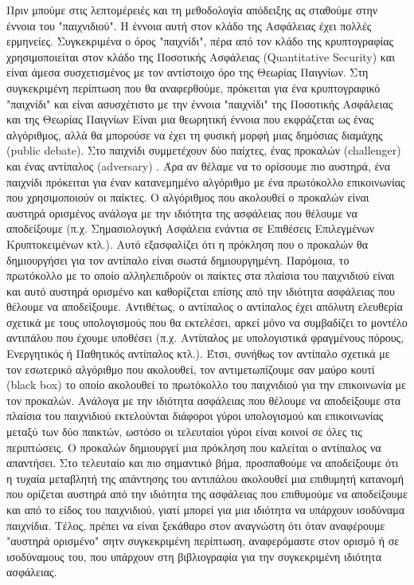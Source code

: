 Πριν μπούμε στις λεπτομέρειές και τη μεθοδολογία απόδειξης ας σταθούμε στην έννοια του "παιχνιδιού". Η έννοια αυτή στον κλάδο της Ασφάλειας έχει πολλές ερμηνείες. Συγκεκριμένα ο όρος "παιχνίδι", πέρα από τον κλάδο της κρυπτογραφίας χρησιμοποιείται στον κλάδο της Ποσοτικής Ασφάλειας (Quantitative Security) και είναι άμεσα συσχετισμένος με τον αντίστοιχο όρο της Θεωρίας Παιγνίων. Στη συγκεκριμένη περίπτωση που θα αναφερθούμε, πρόκειται για ένα κρυπτογραφικό "παιχνίδι" και είναι ασυσχέτιστο με την έννοια "παιχνίδι" της Ποσοτικής Ασφάλειας και της Θεωρίας Παιγνίων \cite{Alpcan2019} Είναι μια θεωρητική έννοια που εκφράζεται ως ένας αλγόριθμος, αλλά θα μπορούσε να έχει τη φυσική μορφή μιας δημόσιας διαμάχης (public debate). Στο παιχνίδι συμμετέχουν δύο παίχτες, ένας προκαλών (challenger) \cdv και ένας αντίπαλος (adversary) \adv. Άρα αν θέλαμε να το ορίσουμε πιο αυστηρά, ένα παιχνίδι πρόκειται για έναν κατανεμημένο αλγόριθμο με ένα πρωτόκολλο επικοινωνίας που χρησιμοποιούν οι παίκτες. Ο αλγόριθμος που ακολουθεί ο προκαλών είναι αυστηρά ορισμένος ανάλογα με την ιδιότητα της ασφάλειας που θέλουμε να αποδείξουμε (π.χ. Σημασιολογική Ασφάλεια ενάντια σε Επιθέσεις Επιλεγμένων Κρυπτοκειμένων κτλ.). Αυτό εξασφαλίζει ότι η πρόκληση που ο προκαλών θα δημιουργήσει για τον αντίπαλο είναι σωστά δημιουργημένη. Παρόμοια, το πρωτόκολλο με το οποίο αλληλεπιδρούν οι παίκτες στα πλαίσια του παιχνιδιού είναι και αυτό αυστηρά ορισμένο και καθορίζεται επίσης από την ιδιότητα ασφάλειας που θέλουμε να αποδείξουμε. Αντιθέτως, ο αντίπαλος ο αντίπαλος έχει απόλυτη ελευθερία σχετικά με τους υπολογισμούς που θα εκτελέσει, αρκεί μόνο να συμβαδίζει το μοντέλο αντιπάλου που έχουμε υποθέσει (π.χ. Αντίπαλος με υπολογιστικά φραγμένους πόρους, Ενεργητικός ή Παθητικός αντίπαλος κτλ.). Έτσι, συνήθως τον αντίπαλο σχετικά με τον εσωτερικό αλγόριθμο που ακολουθεί, τον αντιμετωπίζουμε σαν μαύρο κουτί (black box) το οποίο ακολουθεί το πρωτόκολλο του παιχνιδιού για την επικοινωνία με τον προκαλών. Ανάλογα με την ιδιότητα ασφάλειας που θέλουμε να αποδείξουμε στα πλαίσια του παιχνιδιού εκτελούνται διάφοροι γύροι υπολογισμού και επικοινωνίας μεταξύ των δύο παικτών, ωστόσο οι τελευταίοι γύροι είναι κοινοί σε όλες τις περιπτώσεις. Ο προκαλών δημιουργεί μια πρόκληση που καλείται ο αντίπαλος να απαντήσει. Στο τελευταίο και πιο σημαντικό βήμα, προσπαθούμε να αποδείξουμε ότι η τυχαία μεταβλητή της απάντησης του αντιπάλου ακολουθεί μια επιθυμητή κατανομή που ορίζεται αυστηρά από την ιδιότητα της ασφάλειας που επιθυμούμε να αποδείξουμε και από το είδος του παιχνιδιού, γιατί μπορεί για μια ιδιότητα να υπάρχουν ισοδύναμα παιχνίδια. Τέλος, πρέπει να είναι ξεκάθαρο στον αναγνώστη ότι όταν αναφέρουμε "αυστηρά ορισμένο" σητν συγκεκριμένη περίπτωση, αναφερόμαστε στον ορισμό ή σε ισοδύναμους του, που υπάρχουν στη βιβλιογραφία για την συγκεκριμένη ιδιότητα ασφάλειας.

